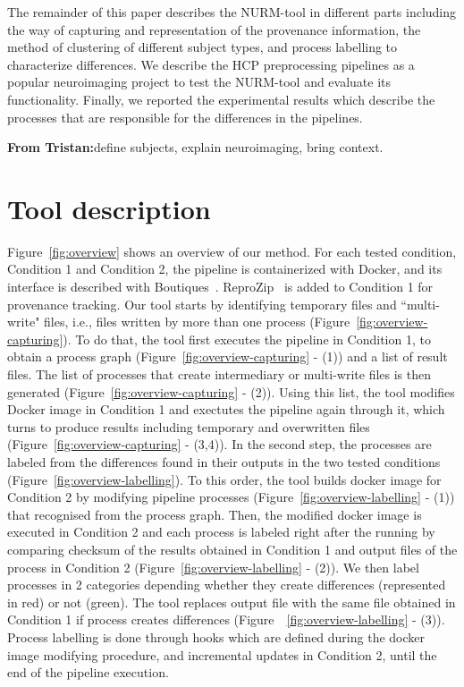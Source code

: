\documentclass[a4paper,num-refs]{oup-contemporary}
\newcommand{\reprozip}[0]{ReproZip\xspace}
\newcommand{\tristan}[1]{\color{blue}\textbf{From Tristan:}#1\color{black}}
\begin{document}
The remainder of this paper describes the NURM-tool in different parts 
including the way of capturing and representation of the provenance 
information, the method of clustering of different subject types, and 
process labelling to characterize differences. We describe the HCP 
preprocessing pipelines as a popular neuroimaging project to test the 
NURM-tool and evaluate its functionality. Finally, we reported the 
experimental results which describe the processes that are responsible 
for the differences in the pipelines.

\tristan{define subjects, explain neuroimaging, bring context.}
\section{Tool description}

Figure~\ref{fig:overview} shows an overview of our method. For each tested
condition, Condition 1 and Condition 2, the pipeline is containerized with
Docker, and its interface is described with
Boutiques~\cite{glatard2017boutiques}. \reprozip~\cite{Chirigati2016} is
added to Condition 1 for provenance tracking. Our tool starts by
identifying temporary files and ``multi-write" files, i.e., files written
by more than one process (Figure~\ref{fig:overview-capturing}). To do that,
the tool first executes the pipeline in Condition 1, to obtain a process
graph (Figure~\ref{fig:overview-capturing} - (1)) and a list of result files.
The list of processes that create intermediary or multi-write
files is then generated (Figure~\ref{fig:overview-capturing} - (2)). 
Using this list, the tool modifies Docker image in Condition 1 and
exectutes the pipeline again through it, which turns to produce results
including temporary and overwritten files
(Figure~\ref{fig:overview-capturing} - (3,4)). In the second step, the
processes are labeled from the differences found in their outputs in the
two tested conditions (Figure~\ref{fig:overview-labelling}). To this order,
the tool builds docker image for Condition 2 by modifying pipeline
processes (Figure~\ref{fig:overview-labelling} - (1)) that recognised from 
the process graph. Then, the modified docker
image is executed in Condition 2 and each process is labeled right after
the running by comparing checksum of the results obtained in Condition 1
and output files of the process in Condition 2
(Figure~\ref{fig:overview-labelling} - (2)). We then label processes in 2
categories depending whether they
create differences (represented in red) or not (green). 
The tool replaces output file with the same file obtained in Condition 1 
if process creates differences (Figure~~\ref{fig:overview-labelling} - (3)).
Process labelling
is done through hooks which are defined during the docker image modifying
procedure, and incremental updates in Condition 2, until the end of the
pipeline execution.
\end{document}
